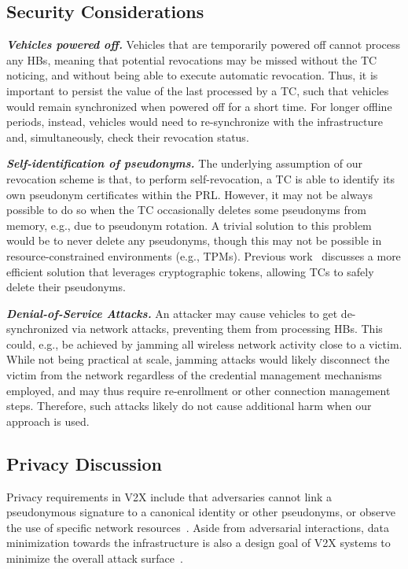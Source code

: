 \subsection{Security Considerations}
\label{section:discussion-security}

\noindent\textbf{\emph{Vehicles powered off.}}
%
Vehicles that are temporarily powered off cannot process any \acp{HB}, meaning
that potential revocations may be missed without the \ac{TC} noticing, and
without being able to execute automatic revocation. Thus, it is important to
persist the value of the last \paramthb{} processed by a \ac{TC}, such that
vehicles would remain synchronized when powered off for a short time. For longer
offline periods, instead, vehicles would need to re-synchronize with the
infrastructure and, simultaneously, check their revocation status.

\noindent\textbf{\emph{Self-identification of pseudonyms.}}
%
The underlying assumption of our revocation scheme is that,  to perform
self-revocation, a \ac{TC} is able to identify its own pseudonym certificates
within the \ac{PRL}. However, it may not be always possible to do so when the
\ac{TC} occasionally deletes some pseudonyms from memory, e.g., due to pseudonym
rotation. A trivial solution to this problem would be to never delete any
pseudonyms, though this may not be possible in resource-constrained environments
(e.g., \acp{TPM}). Previous work~\cite{forster2015rewire,whitefield2017formal}
discusses a more efficient solution that leverages cryptographic tokens,
allowing \acp{TC} to safely delete their pseudonyms.

\noindent\textbf{\emph{Denial-of-Service Attacks.}}
%
An attacker may cause vehicles to get de-synchronized via network attacks,
preventing them from processing \acp{HB}. This could, e.g., be achieved by
jamming all wireless network activity close to a victim. While not being
practical at scale, jamming attacks would likely disconnect the victim from the
network regardless of the credential management mechanisms employed, and may
thus require re-enrollment or other connection management steps. Therefore, such
attacks likely do not cause additional harm when our approach is used.

\subsection{Privacy Discussion}
\label{section:discussion-privacy}

Privacy requirements in V2X include that adversaries cannot link a pseudonymous
signature to a canonical identity or other pseudonyms, or observe the use of
specific network resources~\cite{whitefield2017privacy, etsi2022102941,
yoshizawa2022v2x_survey}. Aside from adversarial interactions, data minimization
towards the infrastructure is also a design goal of V2X systems to minimize the
overall attack surface~\cite{brecht2018scms}.

